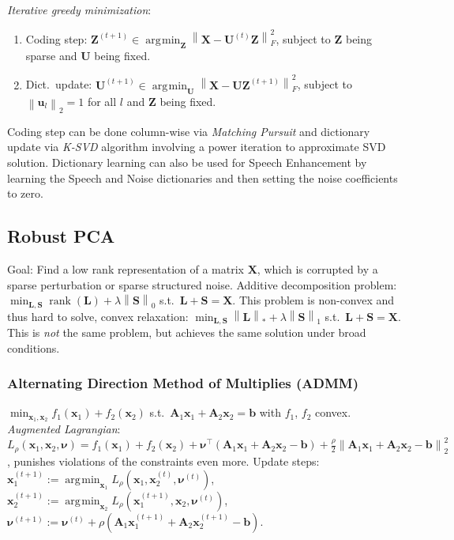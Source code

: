 \documentclass[11pt,a4paper,technote]{IEEEtran}
\DeclareMathOperator*{\argmin}{\arg\!\min}
\newcommand{\norm}[1]{\left\lVert#1\right\rVert}
\newcommand{\matr}[1]{\boldsymbol{\mathbf{#1}}}
\newcommand{\vect}[1]{\boldsymbol{\mathbf{#1}}}
\newcommand{\trns}[1]{#1^{\top}}
\DeclareMathOperator{\rank}{rank}
\begin{document}
\emph{Iterative greedy minimization}:
\begin{enumerate}
  \item Coding step: $\matr{Z}^{(t+1)}\in\argmin_{\matr{Z}}\norm{\matr{X} -
      \matr{U}^{(t)}\matr{Z}}_F^2$, subject to $\matr{Z}$ being sparse and
    $\matr{U}$ being fixed.
  \item Dict.\ update: $\matr{U}^{(t+1)}\in\argmin_{\matr{U}} \norm{\matr{X} -
      \matr{U}\matr{Z}^{(t+1)}}_F^2$, subject to $\norm{\vect{u}_l}_2 = 1$ for
    all $l$ and $\matr{Z}$ being fixed.
\end{enumerate}
Coding step can be done column-wise via \emph{Matching Pursuit} and dictionary
update via \emph{K-SVD} algorithm involving a power iteration to approximate
SVD solution. Dictionary learning can also be used for Speech Enhancement by
learning the Speech and Noise dictionaries and then setting the noise
coefficients to zero.

\vspace{-1em}
\subsection*{Robust PCA}
Goal: Find a low rank representation of a matrix $\matr{X}$, which is corrupted
by a sparse perturbation or sparse structured noise.
Additive decomposition problem: $\min_{\matr{L},\matr{S}} \rank(\matr{L}) +
\lambda \norm{\matr{S}}_0$ s.t.\ $\matr{L}+\matr{S} = \matr{X}$. This
problem is non-convex and thus hard to solve, convex relaxation:
$\min_{\matr{L},\matr{S}} \norm{\matr{L}}_* + \lambda \norm{\matr{S}}_1$ s.t.\
$\matr{L}+\matr{S} = \matr{X}$. This is \emph{not} the same problem, but
achieves the same solution under broad conditions.

\subsubsection*{Alternating Direction Method of Multiplies (ADMM)}
$\min_{\vect{x}_1,\vect{x}_2} f_1(\vect{x}_1) + f_2(\vect{x}_2)$ s.t.\
$\matr{A}_1 \vect{x}_1 + \matr{A}_2\vect{x}_2 = \vect{b}$ with $f_1$, $f_2$
convex. \emph{Augmented Lagrangian}: $L_{\rho}(\vect{x}_1,\vect{x}_2,\vect{\nu})
= f_1(\vect{x}_1) + f_2(\vect{x}_2) + \trns{\vect{\nu}}(\matr{A}_1\vect{x}_1 +
\matr{A}_2 \vect{x}_2 - \vect{b}) + \frac{\rho}{2}\norm{\matr{A}_1\vect{x}_1 +
  \matr{A}_2\vect{x}_2 - \vect{b}}_2^2$, punishes violations of the constraints
even more. Update steps: $\vect{x}_1^{(t+1)} := \argmin_{\vect{x}_1}
L_{\rho}(\vect{x}_1, \vect{x}_2^{(t)}, \vect{\nu}^{(t)})$, $\vect{x}_2^{(t+1)}
:= \argmin_{\vect{x}_2} L_{\rho}(\vect{x}_1^{(t+1)}, \vect{x}_2,
\vect{\nu}^{(t)})$, $\vect{\nu}^{(t+1)} := \vect{\nu}^{(t)} + \rho(\matr{A}_1
\vect{x}_1^{(t+1)} + \matr{A}_2\vect{x}_2^{(t+1)} - \vect{b})$.
\end{document}
